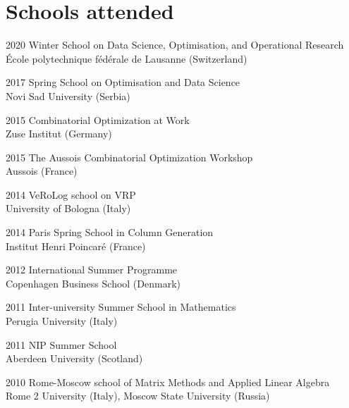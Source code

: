 \section*{Schools attended}

\begin{paracol}{2}
  2020
\switchcolumn
  Winter School on Data Science, Optimisation, and Operational Research\\
  École polytechnique fédérale de Lausanne (Switzerland)
\end{paracol}

\begin{paracol}{2}
  2017
\switchcolumn
  Spring School on Optimisation and Data Science\\
  Novi Sad University (Serbia)
\end{paracol}

\begin{paracol}{2}
  2015
\switchcolumn
  Combinatorial Optimization at Work\\
  Zuse Institut (Germany)
\end{paracol}

\begin{paracol}{2}
  2015
\switchcolumn
  The Aussois Combinatorial Optimization Workshop\\
  Aussois (France)
\end{paracol}

\begin{paracol}{2}
  2014
\switchcolumn
  VeRoLog school on VRP\\
  University of Bologna (Italy)
\end{paracol}

\begin{paracol}{2}
  2014
\switchcolumn
  Paris Spring School in Column Generation\\
  Institut Henri Poincaré (France)
\end{paracol}

\begin{paracol}{2}
  2012
\switchcolumn
  International Summer Programme\\
  Copenhagen Business School (Denmark)
\end{paracol}

\begin{paracol}{2}
  2011
\switchcolumn
  Inter-university Summer School in Mathematics\\
  Perugia University (Italy)
\end{paracol}

\begin{paracol}{2}
  2011
\switchcolumn
  NIP Summer School\\
  Aberdeen University (Scotland)
\end{paracol}

\begin{paracol}{2}
  2010
\switchcolumn
  Rome-Moscow school of Matrix Methods and Applied Linear Algebra\\
  Rome 2 University (Italy), Moscow State University (Russia)
\end{paracol}